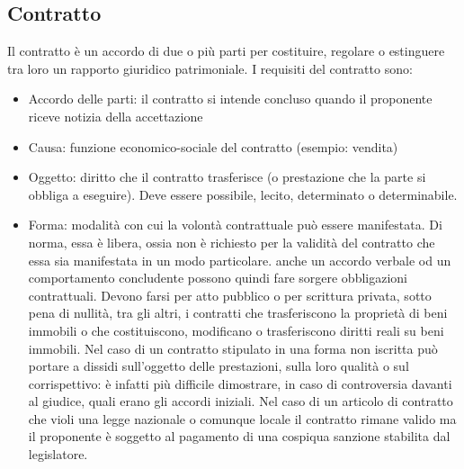 \subsection{Contratto}
Il contratto è un accordo di due o più parti per costituire, regolare o estinguere tra loro un rapporto giuridico patrimoniale.\newline
I requisiti del contratto sono:
\begin{itemize}
    \item Accordo delle parti: il contratto si intende concluso quando il proponente riceve notizia della accettazione
    \item Causa: funzione economico-sociale del contratto (esempio: vendita)
    \item Oggetto: diritto che il contratto trasferisce (o prestazione che la parte si obbliga a eseguire). Deve essere possibile, lecito, determinato
    o determinabile.
    \item Forma: modalità con cui la volontà contrattuale può essere manifestata. Di norma, essa è libera, 
    ossia non è richiesto per la validità del contratto che essa sia manifestata in un modo particolare. anche un accordo verbale od un comportamento 
    concludente possono quindi fare sorgere obbligazioni contrattuali.
    Devono farsi per atto pubblico o per scrittura privata, sotto pena di nullità, tra gli altri, i contratti che trasferiscono la proprietà di beni 
    immobili o che costituiscono, modificano o trasferiscono diritti reali su beni immobili.\newline
    Nel caso di un contratto stipulato in una forma non iscritta può portare a dissidi sull’oggetto delle prestazioni, sulla loro qualità o sul corrispettivo: è 
    infatti più difficile dimostrare, in caso di controversia davanti al giudice, quali erano gli accordi iniziali. \newline
    \newline
    Nel caso di un articolo di contratto che violi una legge nazionale o comunque locale il contratto rimane valido ma il proponente è soggetto
    al pagamento di una cospiqua sanzione stabilita dal legislatore.

\end{itemize}

